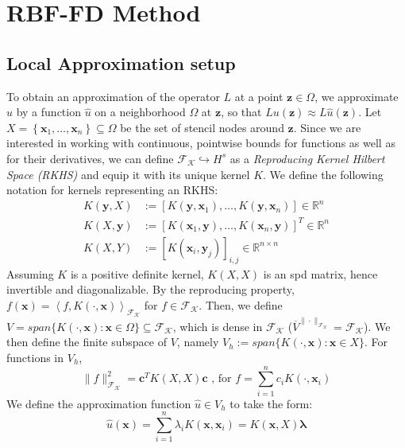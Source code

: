 \documentclass[11pt]{article}
\begin{document}
\pagebreak

\section{RBF-FD Method}

\subsection{Local Approximation setup}
To obtain an approximation of the operator $L$ at a point $\bm{z} \in \Omega$, we approximate $u$ by a function $\hat{u}$ on a neighborhood $\Omega$ at $\bm{z}$, so that $Lu(\bm{z}) \approx L\hat{u}(\bm{z})$. Let $X = \left\{ \bm{x}_1, \dots, \bm{x}_n \right\} \subseteq \Omega$ be the set of stencil nodes around $\bm{z}$. Since we are interested in working with continuous, pointwise bounds for functions as well as for their derivatives, we can define $\mathcal{F_K} \hookrightarrow H^s$ as a \textit{Reproducing Kernel Hilbert Space (RKHS)} and equip it with its unique kernel $K$. We define the following notation for kernels representing an RKHS:
\begin{align*}
	K(\bm{y},X) &:= \left[K(\bm{y}, \bm{x}_1), \hdots, K(\bm{y}, \bm{x}_n) \right] \in \mathbb{R}^n\\
	K(X,\bm{y}) &:= \left[K(\bm{x}_1, \bm{y}), \hdots, K(\bm{x}_n, \bm{y}) \right]^T \in \mathbb{R}^n\\
	K(X,Y) &:= [K(\bm{x}_i, \bm{y}_j)]_{i,j} \in \mathbb{R}^{n \times n}
\end{align*}
Assuming $K$ is a positive definite kernel, $K(X,X)$ is an spd matrix, hence invertible and diagonalizable. By the reproducing property, $f(\bm{x})= \left \langle f, K(\cdot,\bm{x}) \right \rangle_\mathcal{F_K}$ for $f \in \mathcal{F_K}$. Then, we define $V = span\{K(\cdot,\bm{x}): \bm{x} \in \Omega\} \subseteq \mathcal{F_K}$, which is dense in $\mathcal{F_K}$ ($\overline{V}^{\| \cdot \|_{\mathcal{F_K}}}=\mathcal{F_K}$). We then define the finite subspace of $V$, namely $V_h := span\{K(\cdot,\bm{x}): \bm{x} \in X\}$. For functions in $V_h$,
\begin{equation*}
	\| f \|_{\mathcal{F_K}}^2 = \bm{c}^T K(X,X)\bm{c} \text{ , for } f=\sum_{i=1}^n c_i K(\cdot, \bm{x}_i)
\end{equation*}
We define the approximation function $\hat{u} \in V_h$ to take the form:
\begin{equation}
	\hat{u}(\bm{x}) = \sum_{i=1}^n \lambda_i K(\bm{x}, \bm{x}_i) = K(\bm{x}, X) \bm{\lambda}
\end{equation}
\end{document}
